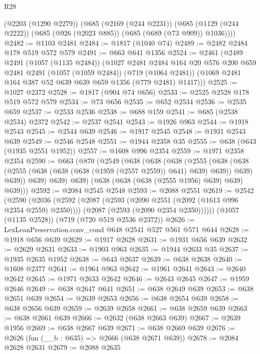 \begin{lexlean}{R28}
\begin{coremodule}
    (@2203 (@1290 @2279))
    (@685
      (@2169 (@244 @2231))
      (@685 (@1129 (@244 @2222)) (@685 (@926 (@2023 @885)) (@685 (@689 (@73 @909)) @1036))))
@2482 := @1103 @2481
@2484 := @1817 (@1040 @74)
@2489 := @2482 @2484 @178 @519 @572 @579
@2491 := @663 @641 @1356
@2524 := @2461
    (@2489
      @2491
      (@1057 (@1135 @2484))
      (@1027
        @2481
        @2484
        @164
        @20
        @576
        @200
        @659
        @2481
        @2491
        (@1057 (@1059 @2484))
        (@719 (@1064 @2481))
        (@1069 @2481 @164 @387 @52 @639 @639 @659 @1356 (@779 @2481) @1417)))
@2525 := @1027 @2372
@2528 := @1817 (@904 @74 @656)
@2533 := @2525 @2528 @178 @519 @572 @579
@2534 := @73 @656
@2535 := @652 @2534
@2536 := @2535 @659
@2537 := @2533 @2536
@2538 := @688 @159
@2541 := @685 (@2538 @2534) @2372
@2542 := @2537 @2541
@2543 := @1926 @963
@2544 := @1918 @2543
@2545 := @2544 @639
@2546 := @1917 @2545
@2548 := @1931 @2543 @639
@2549 := @2546 @2548
@2551 := @1944 @2358 @35
@2555 := @638 (@643 (@1935 @2551 @1952))
@2557 := @1608 @996 @2354
@2559 := @1971 @2358 @2354
@2590 := @663
    (@870
      (@2549
        (@638
          (@638
            (@638
              (@2555
                (@638
                  (@638 (@2555 (@638 (@638 (@638 (@1959 (@2557 @2559)) @641) @639) @639)) @639)
                  @639))
              @639)
            @639)
          @639)
        (@638 (@638 (@638 (@2555 @1956) @639) @639) @639)))
@2592 := @2084 @2545 @2548
@2593 := @2088 @2551
@2619 := @2542
    (@2590
      (@2036
        (@2592
          (@2087 (@2593 (@2090 @2551 (@2092 (@1613 @996 @2354 @2559) @2350))))
          (@2087 (@2593 (@2090 @2354 @2350))))))
    (@1057 (@1135 @2528))
    (@719 (@720 @519 @2536 @2372))
@2626 := LexLeanPreservation.conv_cond @648 @2541 @527 @561 @571 @644
@2628 := @1918 @656 @639
@2629 := @1917 @2628
@2631 := @1931 @656 @639
@2632 := @2629 @2631
@2633 := @1903 @963
@2635 := @1944 @2633 @35
@2637 := @1935 @2635 @1952
@2638 := @643 @2637
@2639 := @638 @2638
@2640 := @1608 @2377
@2641 := @1964 @963
@2642 := @1961 @2641
@2643 := @2640 @2642
@2645 := @1971 @2633 @2642
@2646 := @2643 @2645
@2647 := @1959 @2646
@2649 := @638 @2647 @641
@2651 := @638 @2649 @639
@2653 := @638 @2651 @639
@2654 := @2639 @2653
@2656 := @638 @2654 @639
@2658 := @638 @2656 @639
@2659 := @2639 @2658
@2661 := @638 @2659 @639
@2663 := @638 @2661 @639
@2666 := @2632 (@638 @2663 @639)
@2667 := @2639 @1956
@2669 := @638 @2667 @639
@2671 := @638 @2669 @639
@2676 := @2626 (fun (__b : @635) => @2666 (@638 @2671 @639))
@2678 := @2084 @2628 @2631
@2679 := @2088 @2635

\end{coremodule}
\end{lexlean}
